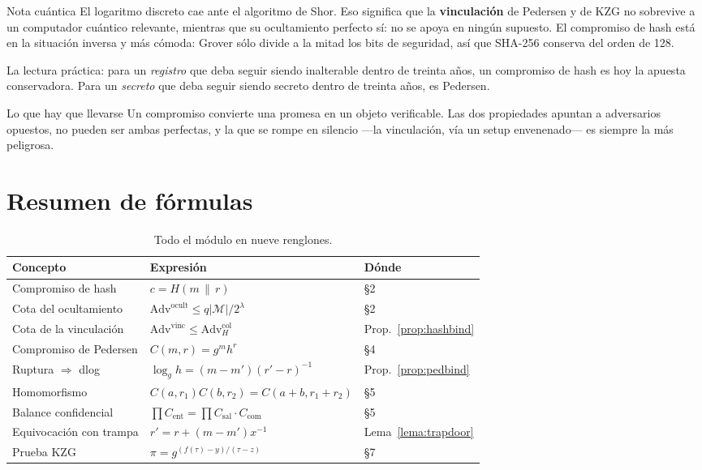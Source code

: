 \documentclass[11pt,a4paper]{article}
\theoremstyle{definition}
\theoremstyle{plain}
\theoremstyle{remark}
\newcommand{\concat}{\,\|\,}
\newcommand{\Adv}{\mathrm{Adv}}
\begin{document}
\begin{nota}{Nota cuántica}
El logaritmo discreto cae ante el algoritmo de Shor. Eso significa que la
\textbf{vinculación} de Pedersen y de KZG no sobrevive a un computador cuántico
relevante, mientras que su ocultamiento perfecto sí: no se apoya en ningún
supuesto. El compromiso de hash está en la situación inversa y más cómoda: Grover
sólo divide a la mitad los bits de seguridad, así que SHA-256 conserva del orden
de 128.

La lectura práctica: para un \emph{registro} que deba seguir siendo inalterable
dentro de treinta años, un compromiso de hash es hoy la apuesta conservadora.
Para un \emph{secreto} que deba seguir siendo secreto dentro de treinta años, es
Pedersen.
\end{nota}

\begin{aviso}{Lo que hay que llevarse}
Un compromiso convierte una promesa en un objeto verificable. Las dos propiedades
apuntan a adversarios opuestos, no pueden ser ambas perfectas, y la que se rompe
en silencio ---la vinculación, vía un setup envenenado--- es siempre la más
peligrosa.
\end{aviso}

\clearpage
\appendix
\section{Resumen de fórmulas}

\begin{table}[htbp]
\centering\small
\caption{Todo el módulo en nueve renglones.}
\begin{tabular}{@{}l l l@{}}
\toprule
\textbf{Concepto} & \textbf{Expresión} & \textbf{Dónde} \\
\midrule
Compromiso de hash        & $c = H(m \concat r)$ & §2 \\
Cota del ocultamiento     & $\Adv^{\text{ocult}} \le q|\mathcal{M}|/2^{\lambda}$ & §2 \\
Cota de la vinculación    & $\Adv^{\text{vinc}} \le \Adv^{\text{col}}_H$ & Prop.~\ref{prop:hashbind} \\
Compromiso de Pedersen    & $C(m,r) = g^{m}h^{r}$ & §4 \\
Ruptura $\Rightarrow$ dlog & $\log_g h = (m-m')(r'-r)^{-1}$ & Prop.~\ref{prop:pedbind} \\
Homomorfismo              & $C(a,r_1)C(b,r_2) = C(a{+}b, r_1{+}r_2)$ & §5 \\
Balance confidencial      & $\prod C_{\text{ent}} = \prod C_{\text{sal}} \cdot C_{\text{com}}$ & §5 \\
Equivocación con trampa   & $r' = r + (m-m')x^{-1}$ & Lema~\ref{lema:trapdoor} \\
Prueba KZG                & $\pi = g^{(f(\tau)-y)/(\tau-z)}$ & §7 \\
\bottomrule
\end{tabular}
\end{table}
\end{document}
